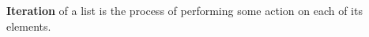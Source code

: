 \descriptn

\textbf{Iteration} of a list is the process of performing some action on each of its elements.
